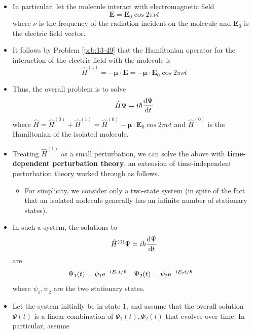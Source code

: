 \documentclass[../notes.tex]{subfiles}
\begin{document}
\begin{itemize}
\begin{itemize}
    \end{itemize}
    \item In particular, let the molecule interact with electromagnetic field
    \begin{equation*}
        \mathbf{E} = \mathbf{E}_0\cos 2\pi\nu t
    \end{equation*}
    where $\nu$ is the frequency of the radiation incident on the molecule and $\mathbf{E}_0$ is the electric field vector.
    \item It follows by Problem \ref{prb:13-49} that the Hamiltonian operator for the interaction of the electric field with the molecule is
    \begin{equation*}
        \hat{H}^{(1)} = -\bm{\mu}\cdot\mathbf{E} = -\bm{\mu}\cdot\mathbf{E}_0\cos 2\pi\nu t
    \end{equation*}
    \item Thus, the overall problem is to solve
    \begin{equation*}
        \hat{H}\Psi = i\hbar\dv{\Psi}{t}
    \end{equation*}
    where $\hat{H}=\hat{H}^{(0)}+\hat{H}^{(1)}=\hat{H}^{(0)}-\bm{\mu}\cdot\mathbf{E}_0\cos 2\pi\nu t$ and $\hat{H}^{(0)}$ is the Hamiltonian of the isolated molecule.
    \item Treating $\hat{H}^{(1)}$ as a small perturbation, we can solve the above with \textbf{time-dependent perturbation theory}, an extension of time-independent perturbation theory worked through as follows.
    \begin{itemize}
        \item For simplicity, we consider only a two-state system (in spite of the fact that an isolated molecule generally has an infinite number of stationary states).
    \end{itemize}
    \item In such a system, the solutions to
    \begin{equation*}
        \hat{H}^{(0)}\Psi = i\hbar\dv{\Psi}{t}
    \end{equation*}
    are
    \begin{align*}
        \Psi_1(t) &= \psi_1\e[-iE_1t/\hbar]&
        \Psi_2(t) &= \psi_2\e[-iE_2t/\hbar]
    \end{align*}
    where $\psi_1,\psi_2$ are the two stationary states.
    \item Let the system initially be in state 1, and assume that the overall solution $\Psi(t)$ is a linear combination of $\Psi_1(t),\Psi_2(t)$ that evolves over time. In particular, assume

\end{itemize}
\end{document}
